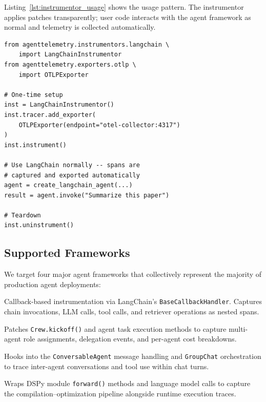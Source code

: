 \documentclass[sigconf,nonacm]{acmart}
\begin{document}
Listing~\ref{lst:instrumentor_usage} shows the usage pattern.  The
instrumentor applies patches transparently; user code interacts with
the agent framework as normal and telemetry is collected automatically.

\begin{lstlisting}[caption={Instrumentor usage: automatic telemetry
  collection requires no changes to user code.},
  label={lst:instrumentor_usage},float=t]
from agenttelemetry.instrumentors.langchain \
    import LangChainInstrumentor
from agenttelemetry.exporters.otlp \
    import OTLPExporter

# One-time setup
inst = LangChainInstrumentor()
inst.tracer.add_exporter(
    OTLPExporter(endpoint="otel-collector:4317")
)
inst.instrument()

# Use LangChain normally -- spans are
# captured and exported automatically
agent = create_langchain_agent(...)
result = agent.invoke("Summarize this paper")

# Teardown
inst.uninstrument()
\end{lstlisting}

\subsection{Supported Frameworks}
\label{sec:frameworks}

We target four major agent frameworks that collectively represent the
majority of production agent deployments:

\begin{description}[leftmargin=*,nosep,style=unboxed]
    \item[LangChain/LangGraph.]  Callback-based instrumentation via
        LangChain's \texttt{BaseCallbackHandler}.  Captures chain
        invocations, LLM calls, tool calls, and retriever operations
        as nested spans.
    \item[CrewAI.]  Patches \texttt{Crew.kickoff()} and agent task
        execution methods to capture multi-agent role assignments,
        delegation events, and per-agent cost breakdowns.
    \item[AutoGen.]  Hooks into the \texttt{ConversableAgent} message
        handling and \texttt{GroupChat} orchestration to trace
        inter-agent conversations and tool use within chat turns.
    \item[DSPy.]  Wraps DSPy module \texttt{forward()} methods and
        language model calls to capture the compilation--optimization
        pipeline alongside runtime execution traces.
\end{description}
\end{document}
